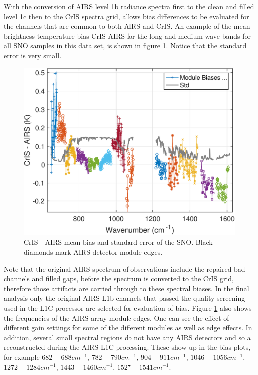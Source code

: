 \documentclass[twocolumn,10pt]{article}
\begin{document}
With the conversion of AIRS level 1b radiance spectra first to the clean and filled level 1c
then to the CrIS spectra grid, allows bias differences to be evaluated for the
channels that are common to both AIRS and CrIS. An example of the mean brightness
temperature bias CrIS-AIRS for the long and medium wave bands for all SNO samples in this
data set, is shown in figure \ref{fig:Y6}. Notice that the standard error is very small.

\begin{figure}[htb]
  \centering
  \includegraphics[width=\linewidth]{./figs/lls_cris_minus_airs.pdf}
  \caption{CrIS - AIRS mean bias and standard error of the SNO. Black diamonds mark AIRS detector module edges.}
  \label{fig:Y6}
\end{figure}

Note that the original AIRS spectrum of observations include the repaired bad channels and filled gaps, before the spectrum is converted to the CrIS grid, therefore those artifacts are carried through to these spectral biases. In the final analysis only the original AIRS L1b channels that passed the quality screening used in the L1C processor are selected for evaluation of bias. Figure \ref{fig:Y6} also shows the frequencies of the AIRS array module edges. One can see the effect of different gain settings for some of the different modules as well as edge effects. In addition, several small spectral regions do not have any AIRS detectors and so a reconstructed during the AIRS L1C processing. These show up in the bias plots, for example $ 682 - 688 cm^{-1} $, $ 782 - 790 cm^{-1} $, $ 904 - 911 cm^{-1} $, $ 1046 - 1056 cm^{-1} $, $ 1272 - 1284 cm^{-1} $, $ 1443 - 1460 cm^{-1} $, $ 1527 - 1541 cm^{-1} $.
\end{document}
